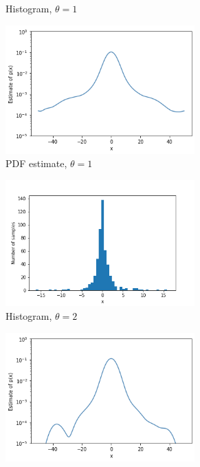 \documentclass[a4paper]{article}
\begin{document}
\begin{figure}[H]
\begin{subfigure}[b]{0.45\textwidth}
        \caption{Histogram, $\theta = 1$}
        \label{fig:gamma_sampled_gaussian_histogram_1}
    \end{subfigure}
    \hfill
    \begin{subfigure}[b]{0.45\textwidth}
        \centering
        \includegraphics[width=0.8\textwidth]{figures/gamma_sampled_gaussian_smoothed_1.png}
        \caption{PDF estimate, $\theta = 1$}
        \label{fig:gamma_sampled_gaussian_smoothed_1}
    \end{subfigure}
    \begin{subfigure}[b]{0.45\textwidth}
        \centering
        \includegraphics[width=0.8\textwidth]{figures/gamma_sampled_gaussian_histogram_2.png}
        \caption{Histogram, $\theta = 2$}
        \label{fig:gamma_sampled_gaussian_histogram_2}
    \end{subfigure}
    \hfill
    \begin{subfigure}[b]{0.45\textwidth}
        \centering
        \includegraphics[width=0.8\textwidth]{figures/gamma_sampled_gaussian_smoothed_2.png}

\end{subfigure}
\end{figure}
\end{document}
